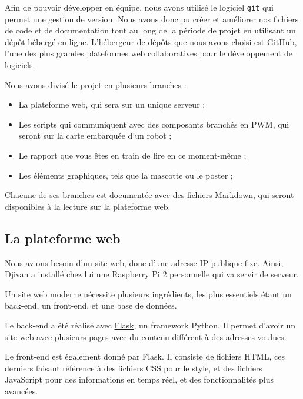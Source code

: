 \documentclass[a4paper,12pt]{report}  %
\begin{document}
Afin de pouvoir développer en équipe, nous avons utilisé le logiciel \texttt{git} qui permet une gestion de version. Nous avons donc pu créer et améliorer nos fichiers de code et de documentation tout au long de la période de projet en utilisant un dépôt hébergé en ligne. L'hébergeur de dépôts que nous avons choisi est \href{https://github.com/}{GitHub}, l'une des plus grandes plateformes web collaboratives pour le développement de logiciels. 

Nous avons divisé le projet en plusieurs branches : 

\begin{itemize}
	\item La plateforme web, qui sera sur un unique serveur ; 
	
	\item Les scripts qui communiquent avec des composants branchés en PWM, qui seront sur la carte embarquée d'un robot ; 
	
	\item Le rapport que vous êtes en train de lire en ce moment-même ; 
	
	\item Les éléments graphiques, tels que la mascotte ou le poster ; 
	
\end{itemize}

Chacune de ses branches est documentée avec des fichiers Markdown, qui seront disponibles à la lecture sur la plateforme web. 



\subsection{La plateforme web}

Nous avions besoin d'un site web, donc d'une adresse IP publique fixe. Ainsi, Djivan a installé chez lui une Raspberry Pi 2 personnelle qui va servir de serveur. 

Un site web moderne nécessite plusieurs ingrédients, les plus essentiels étant un back-end, un front-end, et une base de données. 

Le back-end a été réalisé avec \href{https://flask.palletsprojects.com/en/stable/}{Flask}, un framework Python. Il permet d'avoir un site web avec plusieurs pages avec du contenu différent à des adresses voulues. 

Le front-end est également donné par Flask. Il consiste de fichiers HTML, ces derniers faisant référence à des fichiers CSS pour le style, et des fichiers JavaScript pour des informations en temps réel, et des fonctionnalités plus avancées. 
\end{document}
